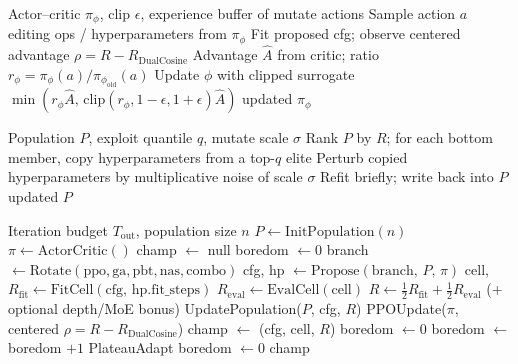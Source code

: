 \begin{algorithm}[H]
\caption{PPO architecture update}
\label{alg:ppo}
\begin{algorithmic}[1]
\Require Actor--critic $\pi_\phi$, clip $\epsilon$, experience buffer of mutate actions
\State Sample action $a$ editing ops / hyperparameters from $\pi_\phi$
\State Fit proposed cfg; observe centered advantage $\rho = R - R_{\mathrm{DualCosine}}$ 
\State Advantage $\hat{A}$ from critic; ratio $r_\phi = \pi_\phi(a)/\pi_{\phi_{\mathrm{old}}}(a)$
\State Update $\phi$ with clipped surrogate $\min(r_\phi\hat{A},\,\mathrm{clip}(r_\phi,1-\epsilon,1+\epsilon)\hat{A})$
\State \Return updated $\pi_\phi$
\end{algorithmic}
\end{algorithm}
\FloatBarrier

\begin{algorithm}[H]
\caption{PBT exploit--mutate}
\label{alg:pbt}
\begin{algorithmic}[1]
\Require Population $P$, exploit quantile $q$, mutate scale $\sigma$
\State Rank $P$ by $R$; for each bottom member, copy hyperparameters from a top-$q$ elite
\State Perturb copied hyperparameters by multiplicative noise of scale $\sigma$
\State Refit briefly; write back into $P$
\State \Return updated $P$
\end{algorithmic}
\end{algorithm}
\FloatBarrier

\begin{algorithm}[H]
\caption{HybridMetaSearch}
\label{alg:hybrid}
\begin{algorithmic}[1]
\Require Iteration budget $T_{\mathrm{out}}$, population size $n$
\State $P \gets \mathrm{InitPopulation}(n)$
\State $\pi \gets \mathrm{ActorCritic}()$
\State champ $\gets$ null
\State boredom $\gets 0$
    \State branch $\gets \mathrm{Rotate}(\mathrm{ppo},\mathrm{ga},\mathrm{pbt},\mathrm{nas},\mathrm{combo})$
    \State cfg, hp $\gets \mathrm{Propose}(\mathrm{branch},\,P,\,\pi)$
    \State cell, $R_{\mathrm{fit}} \gets \mathrm{FitCell}(\mathrm{cfg},\,\mathrm{hp.fit\_steps})$
    \State $R_{\mathrm{eval}} \gets \mathrm{EvalCell}(\mathrm{cell})$
    \State $R \gets \tfrac12 R_{\mathrm{fit}} + \tfrac12 R_{\mathrm{eval}}$ (+ optional depth/MoE bonus)
    \State UpdatePopulation($P$, cfg, $R$)
    \State PPOUpdate($\pi$, centered $\rho = R - R_{\mathrm{DualCosine}}$)
      \State champ $\gets$ (cfg, cell, $R$)
      \State boredom $\gets 0$
    \Else
      \State boredom $\gets$ boredom $+1$
    \EndIf
      \State PlateauAdapt
      \State boredom $\gets 0$
    \EndIf
\EndFor
\State \Return champ
\end{algorithmic}
\end{algorithm}
\FloatBarrier
